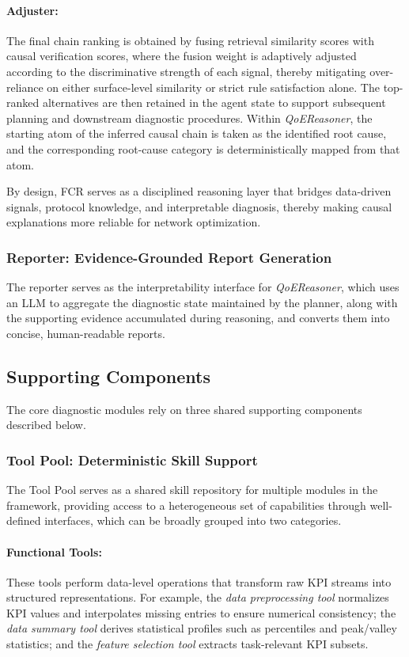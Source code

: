 \documentclass[sigconf,10pt]{acmart} %
\begin{document}
\paragraph{Adjuster:}
The final chain ranking is obtained by fusing retrieval similarity scores with causal verification scores, where the fusion weight is adaptively adjusted according to the discriminative strength of each signal, thereby mitigating over-reliance on either surface-level similarity or strict rule satisfaction alone. The top-ranked alternatives are then retained in the agent state to support subsequent planning and downstream diagnostic procedures. Within \textit{QoEReasoner}, the starting atom of the inferred causal chain is taken as the identified root cause, and the corresponding root-cause category is deterministically mapped from that atom.


By design, FCR serves as a disciplined reasoning layer that bridges data-driven signals, protocol knowledge, and interpretable diagnosis, thereby making causal explanations more reliable for network optimization.


\subsubsection{Reporter: Evidence-Grounded Report Generation}
\label{subsec:reporter}
The reporter serves as the interpretability interface for \textit{QoEReasoner}, which uses an LLM to aggregate the diagnostic state maintained by the planner, along with the supporting evidence accumulated during reasoning, and converts them into concise, human-readable reports.

\subsection{Supporting Components}
\label{subsec:supporting-components}
The core diagnostic modules rely on three shared supporting components described below.
\subsubsection{Tool Pool: Deterministic Skill Support}
\label{subsec:tp}
The Tool Pool serves as a shared skill repository for multiple modules in the framework, providing access to a heterogeneous set of capabilities through well-defined interfaces, which can be broadly grouped into two categories.


\paragraph{Functional Tools:}
These tools perform data-level operations that transform raw KPI streams into structured representations. For example, the \textit{data preprocessing tool} normalizes KPI values and interpolates missing entries to ensure numerical consistency; the \textit{data summary tool} derives statistical profiles such as percentiles and peak/valley statistics; and the \textit{feature selection tool} extracts task-relevant KPI subsets.
\end{document}
